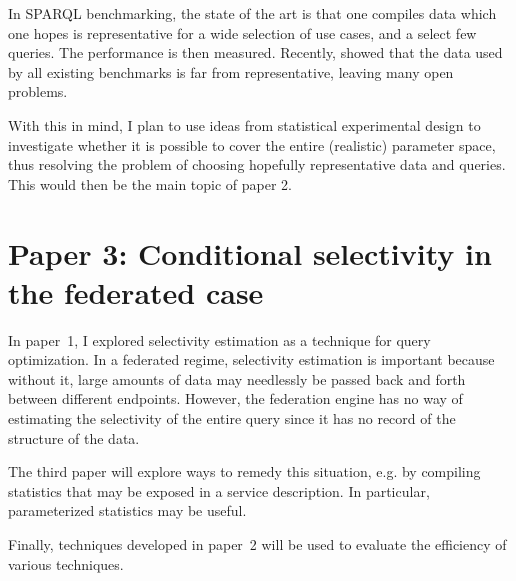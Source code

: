 \documentclass[a4paper,english,10pt]{article}
\begin{document}
In SPARQL benchmarking, the state of the art is that one compiles data
which one hopes is representative for a wide selection of use cases,
and a select few queries. The performance is then measured. Recently,
\cite{Duan:2011:AOC:1989323.1989340} showed that the data used by all
existing benchmarks is far from representative, leaving many open
problems.

With this in mind, I plan to use ideas from statistical experimental
design to investigate whether it is possible to cover the entire
(realistic) parameter space, thus resolving the problem of choosing
hopefully representative data and queries. This would then be the main
topic of paper 2.

\section*{Paper 3: Conditional selectivity in the federated case}

In paper~1, I explored selectivity estimation as a technique for query
optimization. In a federated regime, selectivity estimation is
important because without it, large amounts of data may needlessly be
passed back and forth between different endpoints. However, the
federation engine has no way of estimating the selectivity of the
entire query since it has no record of the structure of the data.

The third paper will explore ways to remedy this situation, e.g. by
compiling statistics that may be exposed in a service description. In
particular, parameterized statistics may be useful. 

Finally, techniques developed in paper~2 will be used to evaluate the
efficiency of various techniques.
\end{document}
